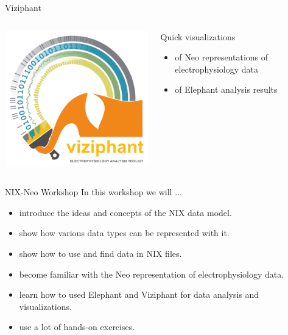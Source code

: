 \documentclass[pdftex]{beamer}
\begin{document}
\begin{frame}{Viziphant}
    \begin{columns}
        \begin{column}{6cm}
            \includegraphics[width=\textwidth]{resources/viziphant_logo_sidebar.png}
        \end{column}
        \begin{column}{6cm}
            Quick visualizations
            \begin{itemize}
                \item of Neo representations of electrophysiology data
                \item of Elephant analysis results
            \end{itemize}
        \end{column}
    \end{columns}
\end{frame}




\begin{frame}{NIX-Neo Workshop}
    In this workshop we will ...
    \begin{itemize}
        \item introduce the ideas and concepts of the NIX data model.
        \item show how various data types can be represented with it.
        \item show how to use and find data in NIX files.
        \item become familiar with the Neo representation of electrophysiology data.
        \item learn how to used Elephant and Viziphant for data analysis and visualizations.
        \item use a lot of hands-on exercises.
    \end{itemize}
\end{frame}
\end{document}
